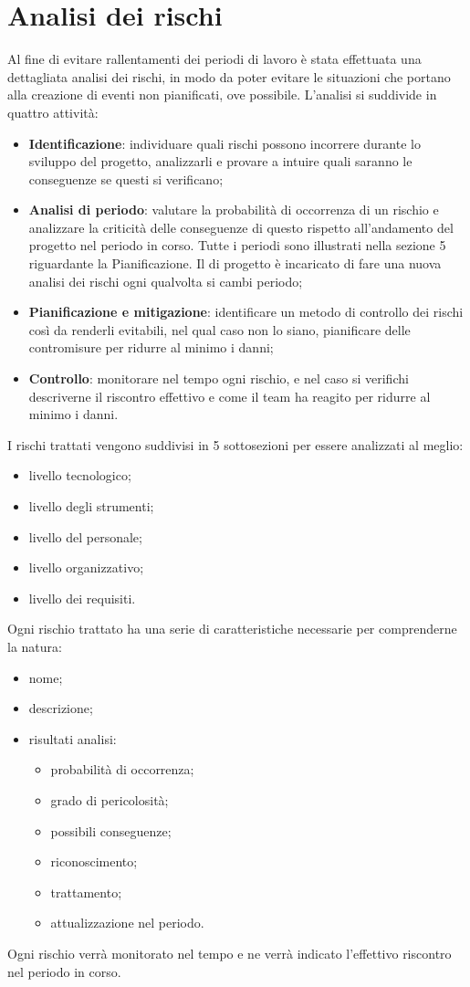 \documentclass[PianoDiProgetto.tex]{subfiles}
\begin{document}
\section{Analisi dei rischi}
Al fine di evitare rallentamenti dei periodi di lavoro è stata effettuata una dettagliata analisi dei rischi, in modo da poter evitare le situazioni che portano alla creazione di eventi non pianificati, ove possibile. L'analisi si suddivide in quattro attività:
	\begin{itemize}
		\item \textbf{Identificazione}: individuare quali rischi possono incorrere durante lo sviluppo del progetto, analizzarli e provare a intuire quali saranno le conseguenze se questi si verificano;
		\item \textbf{Analisi di periodo}: valutare la probabilità di occorrenza di un rischio e analizzare la criticità delle conseguenze di questo rispetto all'andamento del progetto nel periodo in corso. Tutte i periodi sono illustrati nella sezione 5 riguardante la Pianificazione. Il \RESP{} di progetto è incaricato  di fare una nuova analisi dei rischi ogni qualvolta si cambi periodo;
		\item \textbf{Pianificazione e mitigazione}: identificare un metodo di controllo dei rischi così da renderli evitabili, nel qual caso non lo siano, pianificare delle contromisure per ridurre al minimo i danni;
		\item \textbf{Controllo}: monitorare nel tempo ogni rischio, e nel caso si verifichi descriverne il riscontro effettivo e come il team ha reagito per ridurre al minimo i danni.
	\end{itemize}
I rischi trattati vengono suddivisi in 5 sottosezioni per essere analizzati al meglio:
	\begin{itemize}
		\item livello tecnologico;
		\item livello degli strumenti;
		\item livello del personale;
		\item livello organizzativo;
		\item livello dei requisiti.
	\end{itemize}
Ogni rischio trattato ha una serie di caratteristiche necessarie per comprenderne la natura:
	\begin{itemize}
		\item nome;
		\item descrizione;
		\item risultati analisi:
			\begin{itemize}
				\item probabilità di occorrenza;
				\item grado di pericolosità;
				\item possibili conseguenze;
				\item riconoscimento;
				\item trattamento;
				\item attualizzazione nel periodo.
			\end{itemize}
	\end{itemize}
Ogni rischio verrà monitorato nel tempo e ne verrà indicato l'effettivo riscontro nel periodo in corso.
\end{document}
